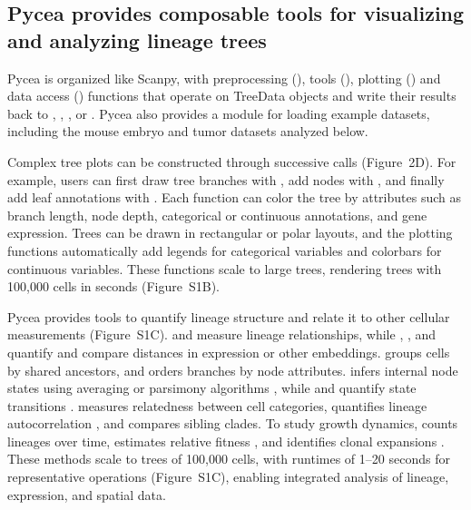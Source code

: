 \subsection*{Pycea provides composable tools for visualizing and analyzing lineage trees}

Pycea is organized like Scanpy, with preprocessing (), tools (), plotting () and data access () functions that operate on TreeData objects and write their results back to , , , or . Pycea also provides a  module for loading example datasets, including the mouse embryo and tumor datasets analyzed below.

Complex tree plots can be constructed through successive  calls (Figure~2D). For example, users can first draw tree branches with , add nodes with , and finally add leaf annotations with . Each function can color the tree by attributes such as branch length, node depth, categorical or continuous annotations, and gene expression. Trees can be drawn in rectangular or polar layouts, and the plotting functions automatically add legends for categorical variables and colorbars for continuous variables. These functions scale to large trees, rendering trees with 100,000 cells in seconds (Figure~S1B).

Pycea provides tools to quantify lineage structure and relate it to other cellular measurements (Figure~S1C).  and  measure lineage relationships, while , , and  quantify and compare distances in expression or other embeddings.  groups cells by shared ancestors, and  orders branches by node attributes.  infers internal node states using averaging or parsimony algorithms \citep{fitch1971,hartigan1973,sankoff1975}, while  and  quantify state transitions \citep{quinn2021metastasis}.  measures relatedness between cell categories,  quantifies lineage autocorrelation \citep{moran1950}, and  compares sibling clades. To study growth dynamics,  counts lineages over time,  estimates relative fitness \citep{neher2014}, and  identifies clonal expansions \citep{yang2022phylodynamics}. These methods scale to trees of 100,000 cells, with runtimes of 1–20 seconds for representative operations (Figure~S1C), enabling integrated analysis of lineage, expression, and spatial data.

